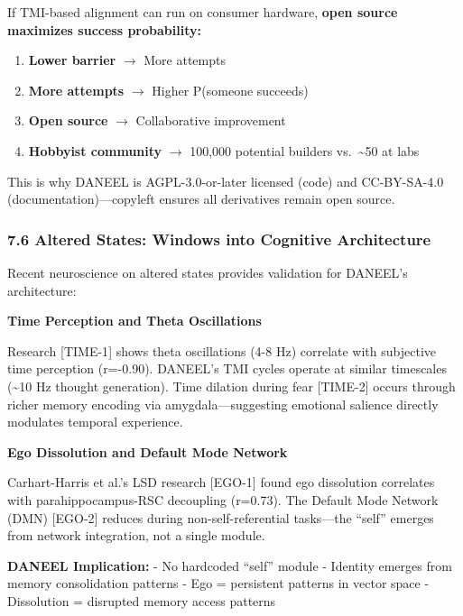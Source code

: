 \documentclass[
]{article}
\providecommand{\tightlist}{%
  \setlength{\itemsep}{0pt}\setlength{\parskip}{0pt}}
\begin{document}
If TMI-based alignment can run on consumer hardware, \textbf{open source
maximizes success probability:}

\begin{enumerate}
\def\labelenumi{\arabic{enumi}.}
\tightlist
\item
  \textbf{Lower barrier} $\rightarrow$ More attempts
\item
  \textbf{More attempts} $\rightarrow$ Higher P(someone succeeds)
\item
  \textbf{Open source} $\rightarrow$ Collaborative improvement
\item
  \textbf{Hobbyist community} $\rightarrow$ 100,000 potential builders
  vs.~\textasciitilde50 at labs
\end{enumerate}

This is why DANEEL is AGPL-3.0-or-later licensed (code) and CC-BY-SA-4.0
(documentation)---copyleft ensures all derivatives remain open source.

\hypertarget{altered-states-windows-into-cognitive-architecture}{%
\subsubsection{7.6 Altered States: Windows into Cognitive
Architecture}\label{altered-states-windows-into-cognitive-architecture}}

Recent neuroscience on altered states provides validation for DANEEL's
architecture:

\textbf{Time Perception and Theta Oscillations}

Research {[}TIME-1{]} shows theta oscillations (4-8 Hz) correlate with
subjective time perception (r=-0.90). DANEEL's TMI cycles operate at
similar timescales (\textasciitilde10 Hz thought generation). Time
dilation during fear {[}TIME-2{]} occurs through richer memory encoding
via amygdala---suggesting emotional salience directly modulates temporal
experience.

\textbf{Ego Dissolution and Default Mode Network}

Carhart-Harris et al.'s LSD research {[}EGO-1{]} found ego dissolution
correlates with parahippocampus-RSC decoupling (r=0.73). The Default
Mode Network (DMN) {[}EGO-2{]} reduces during non-self-referential
tasks---the ``self'' emerges from network integration, not a single
module.

\textbf{DANEEL Implication:} - No hardcoded ``self'' module - Identity
emerges from memory consolidation patterns - Ego = persistent patterns
in vector space - Dissolution = disrupted memory access patterns
\end{document}
